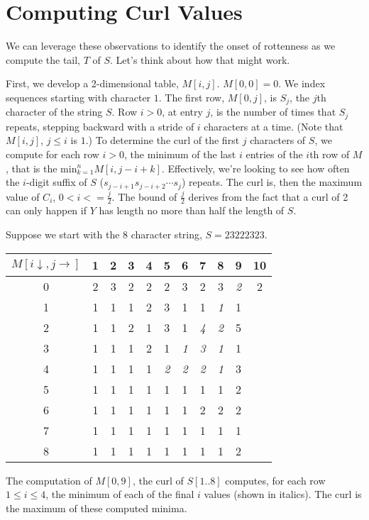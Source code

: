 \documentclass[11pt]{article}
\def\ni{\noindent}
\begin{document}
\section{Computing Curl Values} 
We can leverage these observations to identify the onset of rottenness as
we compute the tail, $T$ of $S$.  Let's think about how that might work.

First, we develop a 2-dimensional table, $M[i,j]$.  $M[0,0]=0$.  We index sequences starting
with character $1$.  The first row, $M[0,j]$, is $S_j$, the $j$th character
of the string $S$.  Row $i>0$, at entry $j$, is the number of times that 
$S_j$ repeats, stepping backward with a stride of $i$ characters at a time.  (Note that $M[i,j]$, $j\le i$ is $1$.)  To determine the curl of the first $j$ characters of $S$,
we compute for each row $i>0$, the minimum of the last $i$ entries of the 
$i$th row of $M$, that is the $\mathrm{min}_{k=1}^nM[i,j-i+k]$.  Effectively, we're looking to see how often the $i$-digit
suffix of $S$ ($s_{j-i+1}s_{j-i+2}\cdots s_j$) repeats.  The curl is, then the maximum value of $C_i$, $0<i<=\frac{j}{2}$.  The bound of $\frac{j}{2}$ derives from the fact that a curl of
2 can only happen if $Y$ has length no more than half the length of $S$.

\ni{\bf Example.} Suppose we start with the 8 character string, $S=23222323$.
\begin{center}
\begin{tabular}{|c||c|c|c|c|c|c|c|c||c|c|}
\hline
$M[i\downarrow,j\rightarrow]$ & 1 & 2 & 3 & 4 & 5 & 6 & 7 & 8 & 9 & 10 \\\hline\hline
0 &  2 & 3 & 2 & 2 & 2 & 3 & 2 & 3 & {\em 2} & 2\\\hline
1 &  1 & 1 & 1 & 2 & 3 & 1 & 1 & {\em 1} & 1 &\\
2 &  1 & 1 & 2 & 1 & 3 & 1 & {\em 4} & {\em 2} & 5 &\\
3 &  1 & 1 & 1 & 2 & 1 & {\em 1} & {\em 3} & {\em 1} & 1&\\
4 &  1 & 1 & 1 & 1 & {\em 2} & {\em 2} & {\em 2} & {\em 1} & 3&\\
5 &  1 & 1 & 1 & 1 & 1 & 1 & 1 & 1 & 2&\\
6 &  1 & 1 & 1 & 1 & 1 & 1 & 2 & 2 & 2&\\
7 &  1 & 1 & 1 & 1 & 1 & 1 & 1 & 1 & 1&\\
8 &  1 & 1 & 1 & 1 & 1 & 1 & 1 & 1 & 2&\\\hline
\end{tabular}
\end{center}
\ni The computation of $M[0,9]$, the curl of $S[1..8]$ computes, for each row
$1\le i\le 4$, the minimum of each of the final $i$ values (shown in italics). The curl is the maximum of these computed minima.
\end{document}
